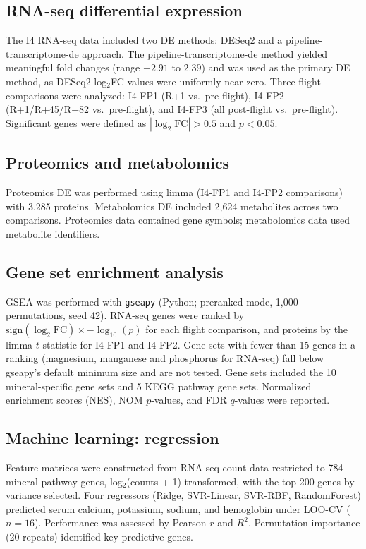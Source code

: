 \documentclass[11pt,a4paper]{article}
\begin{document}
\subsection{RNA-seq differential expression}

The I4 RNA-seq data included two DE methods: DESeq2 and a pipeline-transcriptome-de approach. The pipeline-transcriptome-de method yielded meaningful fold changes (range $-2.91$ to $2.39$) and was used as the primary DE method, as DESeq2 log$_2$FC values were uniformly near zero. Three flight comparisons were analyzed: I4-FP1 (R+1 vs.\ pre-flight), I4-FP2 (R+1/R+45/R+82 vs.\ pre-flight), and I4-FP3 (all post-flight vs.\ pre-flight). Significant genes were defined as $|\log_2\text{FC}| > 0.5$ and $p < 0.05$.

\subsection{Proteomics and metabolomics}

Proteomics DE was performed using limma (I4-FP1 and I4-FP2 comparisons) with 3,285 proteins. Metabolomics DE included 2,624 metabolites across two comparisons. Proteomics data contained gene symbols; metabolomics data used metabolite identifiers.

\subsection{Gene set enrichment analysis}

GSEA was performed with \texttt{gseapy} (Python; preranked mode, 1,000 permutations, seed 42). RNA-seq genes were ranked by $\mathrm{sign}(\log_2\text{FC}) \times -\log_{10}(p)$ for each flight comparison, and proteins by the limma $t$-statistic for I4-FP1 and I4-FP2. Gene sets with fewer than 15 genes in a ranking (magnesium, manganese and phosphorus for RNA-seq) fall below gseapy's default minimum size and are not tested. Gene sets included the 10 mineral-specific gene sets and 5 KEGG pathway gene sets. Normalized enrichment scores (NES), NOM $p$-values, and FDR $q$-values were reported.

\subsection{Machine learning: regression}

Feature matrices were constructed from RNA-seq count data restricted to 784 mineral-pathway genes, log$_2$(counts + 1) transformed, with the top 200 genes by variance selected. Four regressors (Ridge, SVR-Linear, SVR-RBF, RandomForest) predicted serum calcium, potassium, sodium, and hemoglobin under LOO-CV ($n = 16$). Performance was assessed by Pearson $r$ and $R^2$. Permutation importance (20 repeats) identified key predictive genes.
\end{document}
